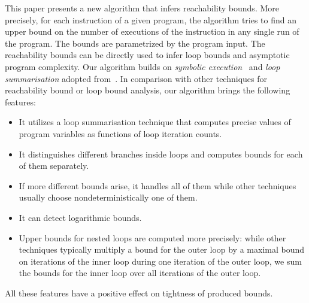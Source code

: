\documentclass[10pt,a4paper]{article}
\begin{document}
This paper presents a new algorithm that infers reachability bounds.
More precisely, for each instruction of a given program, the algorithm
tries to find an upper bound on the number of executions of the
instruction in any single run of the program. The bounds are
parametrized by the program input. The reachability bounds can be
directly used to infer loop bounds and asymptotic program complexity.
Our algorithm builds on \emph{symbolic execution}~\cite{Kin76} and
\emph{loop summarisation} adopted from~\cite{ST12}.
In comparison with
other techniques for reachability bound or loop bound analysis, our
algorithm brings the following features:
\begin{itemize}
\item It utilizes a loop summarisation technique that computes precise
  values of program variables as functions of loop iteration counts.
\item It distinguishes different branches inside loops and computes
  bounds for each of them separately.
\item If more different bounds arise, it handles all of them while
  other techniques usually choose nondeterministically one of them.
\item It can detect logarithmic bounds.
\item Upper bounds for nested loops are computed more precisely: while
  other techniques typically multiply a bound for the outer loop by a
  maximal bound on iterations of the inner loop during one iteration
  of the outer loop, we sum the bounds for the inner loop over all
  iterations of the outer loop.
\end{itemize}
All these features have a positive effect on tightness of produced bounds.
\end{document}
